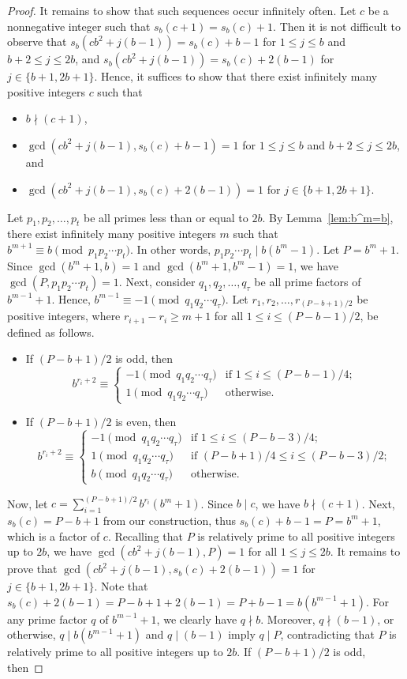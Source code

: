\documentclass[12pt]{article}
\theoremstyle{definition}
\begin{document}
\begin{proof}
It remains to show that such sequences occur infinitely often. Let $c$ be a nonnegative integer such that $s_b(c+1)=s_b(c)+1$. Then it is not difficult to observe that $s_b(cb^2+j(b-1))=s_b(c)+b-1$ for $1\leq j\leq b$ and $b+2\leq j\leq 2b$, and $s_b(cb^2+j(b-1))=s_b(c)+2(b-1)$ for $j\in\{b+1,2b+1\}$. Hence, it suffices to show that there exist infinitely many positive integers $c$ such that
\begin{itemize}
\item $b\nmid(c+1)$,
\item $\gcd(cb^2+j(b-1),s_b(c)+b-1)=1$ for $1\leq j\leq b$ and $b+2\leq j\leq 2b$, and
\item $\gcd(cb^2+j(b-1),s_b(c)+2(b-1))=1$ for $j\in\{b+1,2b+1\}$.
\end{itemize}
Let $p_1,p_2,\dotsc,p_t$ be all primes less than or equal to $2b$. By Lemma~\ref{lem:b^m=b}, there exist infinitely many positive integers $m$ such that $b^{m+1}\equiv b\pmod{p_1p_2\dotsb p_t}$. In other words, $p_1p_2\dotsb p_t\mid b(b^m-1)$. Let $P=b^m+1$. Since $\gcd(b^m+1,b)=1$ and $\gcd(b^m+1,b^m-1)=1$, we have $\gcd(P,p_1p_2\dotsb p_t)=1$. Next, consider $q_1,q_2,\dotsc,q_\tau$ be all prime factors of $b^{m-1}+1$. Hence, $b^{m-1}\equiv-1\pmod{q_1q_2\dotsb q_\tau}$. Let $r_1,r_2,\dotsc,r_{(P-b+1)/2}$ be positive integers, where $r_{i+1}-r_i\geq m+1$ for all $1\leq i\leq(P-b-1)/2$, be defined as follows.
\begin{itemize}
\item If $(P-b+1)/2$ is odd, then
$$b^{r_i+2}\equiv\begin{cases}
-1\pmod{q_1q_2\dotsb q_\tau}&\text{if }1\leq i\leq(P-b-1)/4;\\
1\pmod{q_1q_2\dotsb q_\tau}&\text{otherwise}.
\end{cases}$$
\item If $(P-b+1)/2$ is even, then
$$b^{r_i+2}\equiv\begin{cases}
-1\pmod{q_1q_2\dotsb q_\tau}&\text{if }1\leq i\leq(P-b-3)/4;\\
1\pmod{q_1q_2\dotsb q_\tau}&\text{if }(P-b+1)/4\leq i\leq(P-b-3)/2;\\
b\pmod{q_1q_2\dotsb q_\tau}&\text{otherwise}.
\end{cases}$$
\end{itemize}
Now, let $c=\sum_{i=1}^{(P-b+1)/2}b^{r_i}(b^m+1)$. Since $b\mid c$, we have $b\nmid(c+1)$. Next, $s_b(c)=P-b+1$ from our construction, thus $s_b(c)+b-1=P=b^m+1$, which is a factor of $c$. Recalling that $P$ is relatively prime to all positive integers up to $2b$, we have $\gcd(cb^2+j(b-1),P)=1$ for all $1\leq j\leq 2b$. It remains to prove that $\gcd(cb^2+j(b-1),s_b(c)+2(b-1))=1$ for $j\in\{b+1,2b+1\}$. Note that $s_b(c)+2(b-1)=P-b+1+2(b-1)=P+b-1=b(b^{m-1}+1)$. For any prime factor $q$ of $b^{m-1}+1$, we clearly have $q\nmid b$. Moreover, $q\nmid(b-1)$, or otherwise, $q\mid b(b^{m-1}+1)$ and $q\mid(b-1)$ imply $q\mid P$, contradicting that $P$ is relatively prime to all positive integers up to $2b$. If $(P-b+1)/2$ is odd, then

\end{proof}
\end{document}
